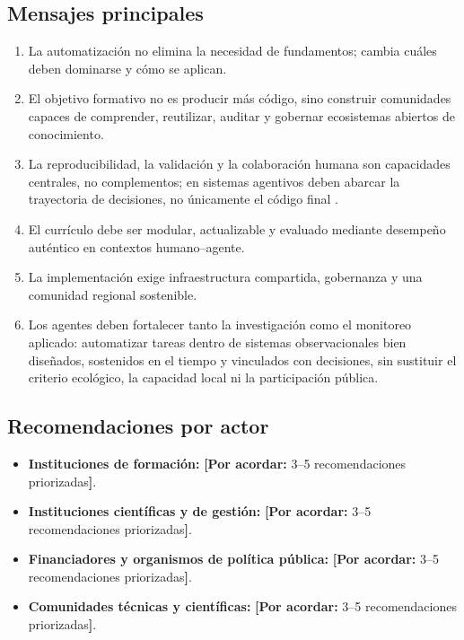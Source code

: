 \documentclass[11pt,a4paper]{article}
\newcommand{\pendiente}[1]{\textcolor{azulieb}{\textbf{[Por acordar:} #1\textbf{]}}}
\begin{document}
\subsection{Mensajes principales}

\begin{enumerate}
  \item La automatización no elimina la necesidad de fundamentos; cambia cuáles
  deben dominarse y cómo se aplican.
  \item El objetivo formativo no es producir más código, sino construir
  comunidades capaces de comprender, reutilizar, auditar y gobernar ecosistemas
  abiertos de conocimiento.
  \item La reproducibilidad, la validación y la colaboración humana son
  capacidades centrales, no complementos; en sistemas agentivos deben abarcar la
  trayectoria de decisiones, no únicamente el código final
  \citep{wei2025agentic}.
  \item El currículo debe ser modular, actualizable y evaluado mediante desempeño
  auténtico en contextos humano--agente.
  \item La implementación exige infraestructura compartida, gobernanza y una
  comunidad regional sostenible.
  \item Los agentes deben fortalecer tanto la investigación como el monitoreo
  aplicado: automatizar tareas dentro de sistemas observacionales bien diseñados,
  sostenidos en el tiempo y vinculados con decisiones, sin sustituir el criterio
  ecológico, la capacidad local ni la participación pública.
\end{enumerate}

\subsection{Recomendaciones por actor}

\begin{itemize}
  \item \textbf{Instituciones de formación:} \pendiente{3--5 recomendaciones
  priorizadas}.
  \item \textbf{Instituciones científicas y de gestión:}
  \pendiente{3--5 recomendaciones priorizadas}.
  \item \textbf{Financiadores y organismos de política pública:}
  \pendiente{3--5 recomendaciones priorizadas}.
  \item \textbf{Comunidades técnicas y científicas:}
  \pendiente{3--5 recomendaciones priorizadas}.
\end{itemize}
\end{document}
